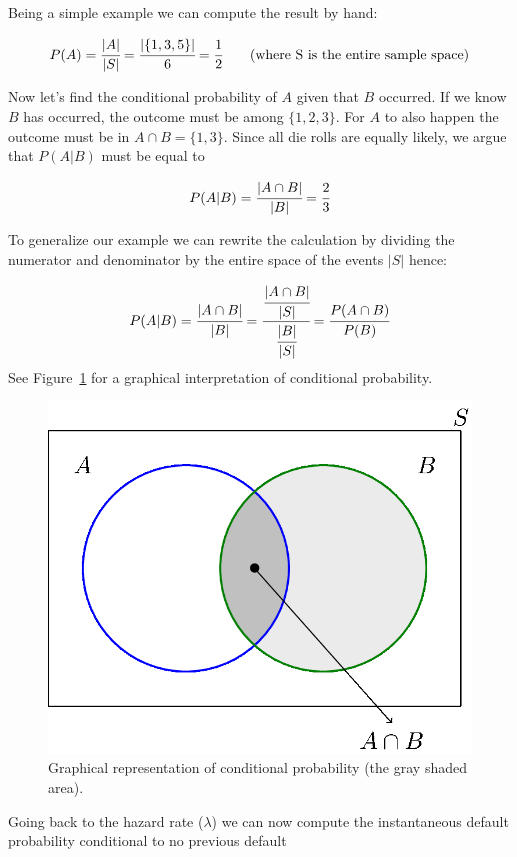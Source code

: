 Being a simple example we can compute the result by hand:

\begin{equation}
P(A) = \cfrac{|A|}{|S|} = \cfrac{|\{1,3,5\}|}{6} = \cfrac{1}{2}\qquad\textrm{(where S is the entire sample space)}
\end{equation}

Now let's find the conditional probability of \(A\) given that \(B\) occurred. If we know \(B\) has occurred, the outcome must be among \(\{1,2,3\}\). For \(A\) to also happen the outcome must be in \(A\cap B = \{1,3\}\). Since all die rolls are equally likely, we argue that \(P(A|B)\) must be equal to

\begin{equation}
P(A|B) = \cfrac{|A\cap B|}{|B|} = \cfrac{2}{3}
\end{equation}

To generalize our example we can rewrite the calculation by dividing the numerator and denominator by the entire space of the events \(|S|\) hence:

\begin{equation}
P(A|B) = \cfrac{|A\cap B|}{|B|} = \cfrac{\cfrac{|A\cap B|}{|S|}}{\cfrac{|B|}{|S|}} = \cfrac{P(A\cap B)}{P(B)}
\end{equation}
See Figure~\ref{fig:conditional_prob} for a graphical interpretation of conditional probability.

\begin{figure}[tb]
\centering
\includegraphics[width=0.5\linewidth]{figures/conditional_b}
\caption{Graphical representation of conditional probability (the gray shaded area).}
\label{fig:conditional_prob}
\end{figure}

Going back to the hazard rate ($\lambda$) we can now compute the instantaneous default probability conditional to no previous default 

